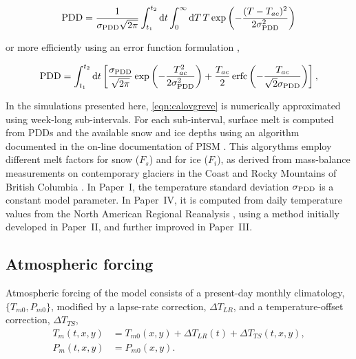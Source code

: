 \documentclass{article}
\newcommand{\unit}[1]{\ensuremath{\mathrm{#1}}}
\newcommand{\degree}[0]{\ensuremath{^{\circ}}}
\begin{document}
\begin{equation}
    \mathrm{PDD} = \frac{1}{\sigma_{\mathrm{PDD}}\sqrt{2\pi}}
        \int_{t_1}^{t_2} \mathrm{d}t
        \int_{0}^{\infty} \mathrm{d}T \,
        T \exp\left({-\frac{(T-T_{ac})^2}{2\sigma_{\mathrm{PDD}}^2}}\right)
\end{equation}

or more efficiently using an error function formulation
\citep{Calov.Greve.2005},

\begin{equation}
    \label{eqn:calovgreve}
    \mathrm{PDD} = \int_{t_1}^{t_2} \mathrm{d}t
        \left[\frac{\sigma_{\mathrm{PDD}}}{\sqrt{2\pi}}
                \exp\left({-\frac{T_{ac}^2}{2\sigma_{\mathrm{PDD}}^2}}\right)
              + \frac{T_{ac}}{2} \, \mathrm{erfc}
                \left(-\frac{T_{ac}}{\sqrt{2}\sigma_{\mathrm{PDD}}}\right)\right],
\end{equation}

In the simulations presented here, \cref{eqn:calovgreve} is numerically
approximated using week-long sub-intervals. For each sub-interval, surface melt
is computed from PDDs and the available snow and ice depths using an algorithm
documented in the on-line documentation of PISM \citep{PISM-authors.2014}. This
algorythms employ different melt factors for snow ($F_s$) and for ice ($F_i$),
as derived from mass-balance measurements on contemporary glaciers in the
Coast and Rocky Mountains of British Columbia \citep{Shea.etal.2009}. In
Paper~I, the temperature standard deviation $\sigma_{\mathrm{PDD}}$ is a constant model
parameter. In Paper~IV, it is computed from daily temperature values from the
North American Regional Reanalysis \citep[NARR,][]{Mesinger.etal.2006}, using
a method initially developed in Paper~II, and further improved in Paper~III.

\subsection{Atmospheric forcing}

Atmospheric forcing of the model consists of a present-day monthly climatology,
$\{T_{m0}, P_{m0}\}$, modified by a lapse-rate correction, ${\Delta}T_{LR}$,
and a temperature-offset correction, ${\Delta}T_{TS}$,
\begin{align}
    T_m(t, x, y) &= T_{m0}(x, y) +{\Delta}T_{LR}(t) +{\Delta}T_{TS}(t, x, y),\\
    P_m(t, x, y) &= P_{m0}(x, y).
\end{align}
\end{document}
